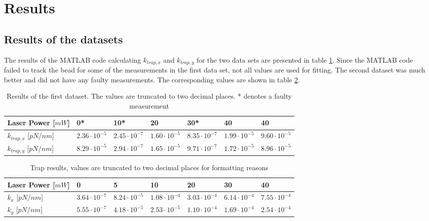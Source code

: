 \section{Results}
\subsection{Results of the datasets}
The results of the MATLAB code calculating $k_{trap,x}$ and $k_{trap,y}$ for the two data sets are presented in table \ref{tab:first-results}. Since the MATLAB code failed to track the bead for some of the measurements in the first data set, not all values are used for fitting. The second dataset was much better and did not have any faulty measurements. The corresponding values are shown in table \ref{tab:second-results}.\\

\vspace{-.2cm}
\begin{table}[h!]
\centering
\begin{tabular}{|l|l|l|l|l|l|l|}
\hline
Laser Power {[}$mW${]} & 0*         & 10*        & 20        & 30*        & 40         & 40        \\ \hline
$k_{trap,x}$    {[}$pN/nm${]}        & $2.36 \cdot 10^{-5}$ &$ 2.45 \cdot 10^{-7}$ & $1.60\cdot 10^{-5}$  & $8.35\cdot 10^{-7}$ & $1.99\cdot 10^{-5}$  & $9.60\cdot 10^{-5}$ \\ \hline
$k_{trap,y}$     {[}$pN/nm${]}       & $8.29 \cdot 10^{-5}$ &$ 2.94\cdot 10^{-7}$ & $1.65\cdot 10^{-5}$ & $9.71\cdot 10^{-7}$ & $1.72\cdot 10^{-5}$ & $8.96\cdot 10^{-5}$ \\ \hline
\end{tabular}
\caption{Results of the first dataset. The values are truncated to two decimal places. * denotes a faulty measurement}
\label{tab:first-results}
\end{table}


\vspace{-.2cm}
\begin{table}[h!]
\centering
    \begin{tabular}{|l|l|l|l|l|l|l|}
        \hline
        Laser Power {[}$mW${]} & 0         & 5         & 10         & 20         & 30         & 40         \\ \hline
        $k_x$     {[}$pN/nm${]}       & $3.64\cdot 10^{-7}$ & $8.24\cdot 10^{-5}$ & $1.08\cdot 10^{-4}$ & $3.03\cdot 10^{-4}$ & $6.14\cdot 10^{-4}$ & $7.55\cdot 10^{-4}$ \\ \hline
        $k_y$     {[}$pN/nm${]}       & $5.55\cdot 10^{-7}$   & $4.18\cdot 10^{-5}$ & $2.53\cdot 10^{-5}$  & $1.10\cdot 10^{-4}$ & $1.69\cdot 10^{-4}$ & $2.54\cdot 10^{-4}$ \\ \hline
    \end{tabular}
\caption{Trap results, values are truncated to two decimal places for formatting reasons}
\label{tab:second-results}
\end{table}

